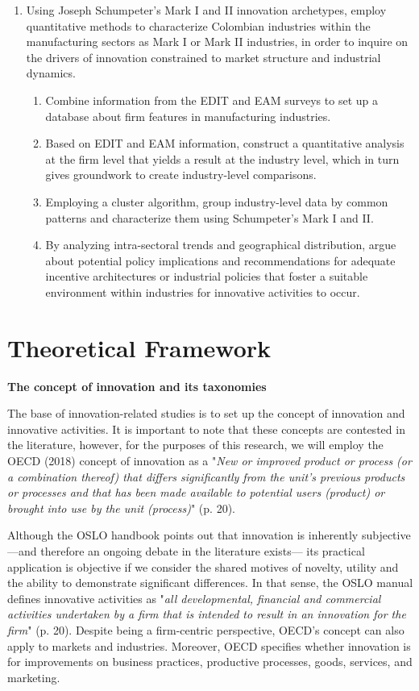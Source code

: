 \documentclass[12pt,a4paper]{article}
\begin{document}
\begin{enumerate}
	\item \large Using Joseph Schumpeter’s Mark I and II innovation archetypes, employ quantitative methods to characterize Colombian industries within the manufacturing sectors as Mark I or Mark II industries, in order to inquire on the drivers of innovation constrained to market structure and industrial dynamics.
\begin{enumerate}
	\item \normalsize Combine information from the EDIT and EAM surveys to set up a database about firm features in manufacturing industries.
	\item Based on EDIT and EAM information, construct a quantitative analysis at the firm level that yields a result at the industry level, which in turn gives groundwork to create industry-level comparisons.
	\item Employing a cluster algorithm, group industry-level data by common patterns and characterize them using Schumpeter's Mark I and II.
	\item By analyzing intra-sectoral trends and geographical distribution, argue about potential policy implications and recommendations for adequate incentive architectures or industrial policies that foster a suitable environment within industries for innovative activities to occur.
\end{enumerate}
\end{enumerate}

\pagebreak

\section{Theoretical Framework}

\textbf{The concept of innovation and its taxonomies }

The base of innovation-related studies is to set up the concept of innovation and innovative activities. It is important to note that these concepts are contested in the literature, however, for the purposes of this research, we will employ the OECD (2018) concept of innovation as a "\textit{New or improved product or process (or a combination thereof) that differs significantly from the unit's previous products or processes and that has been made available to potential users (product) or brought into use by the unit (process)}" (p. 20).  

Although the OSLO handbook points out that innovation is inherently subjective —and therefore an ongoing debate in the literature exists— its practical application is objective if we consider the shared motives of novelty, utility and the ability to demonstrate significant differences. In that sense, the OSLO manual defines innovative activities as "\textit{all developmental, financial and commercial activities undertaken by a firm that is intended to result in an innovation for the firm}" (p. 20). Despite being a firm-centric perspective, OECD's concept can also apply to markets and industries. Moreover, OECD specifies whether innovation is for improvements on business practices, productive processes, goods, services, and marketing.  
\end{document}
